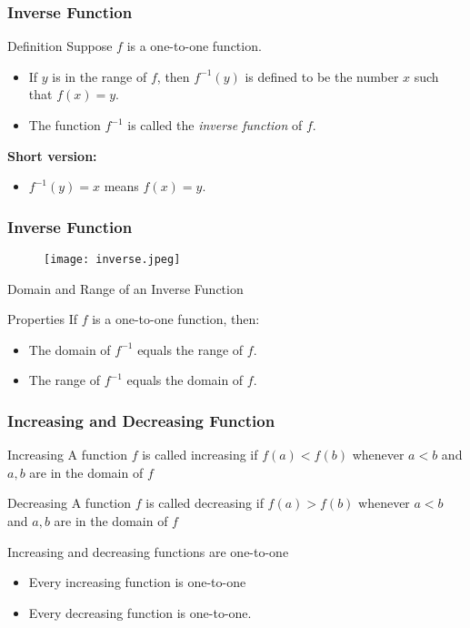 \begin{frame}
  \frametitle{Inverse Function}
  \begin{block}{Definition}
    Suppose \( f \) is a one-to-one function.
    \begin{itemize}
      \item If \( y \) is in the range of \( f \), then \( f^{-1}(y) \) is defined to be the number \( x \) such that \( f(x) = y \).
      \item The function \( f^{-1} \) is called the \emph{inverse function} of \( f \).
    \end{itemize}
    \vspace{1em}
    \textbf{Short version:}
    \begin{itemize}
      \item \( f^{-1}(y) = x \) means \( f(x) = y \).
    \end{itemize}
    \end{block}
\end{frame}
\begin{frame}
  \frametitle{Inverse Function}
\begin{figure}
  \centering
  \texttt{[image: inverse.jpeg]}
\end{figure}
\end{frame}
\begin{frame}{Domain and Range of an Inverse Function}
  \begin{block}{Properties}
  If \( f \) is a one-to-one function, then:
  \begin{itemize}
    \item The domain of \( f^{-1} \) equals the range of \( f \).
    \item The range of \( f^{-1} \) equals the domain of \( f \).
  \end{itemize}
  \end{block}
  \end{frame}
  \begin{frame}
    \frametitle{Increasing and Decreasing Function}
    \begin{block}{Increasing}
      A function \(f\) is called increasing if \(f (a) < f (b)\) whenever \(a < b\) and \(a, b \) are in
the domain of \(f\)
    \end{block}
    \begin{block}{Decreasing}
      A function \(f\) is called decreasing if \(f (a) >  f (b)\) whenever \(a < b\) and \(a, b \) are in
the domain of \(f\)
    \end{block}
    \begin{alertblock}{Increasing and decreasing functions are one-to-one}
      \begin{itemize}
        \item Every increasing function is one-to-one
        \item Every decreasing function is one-to-one.
      \end{itemize}
    \end{alertblock}
  \end{frame}
